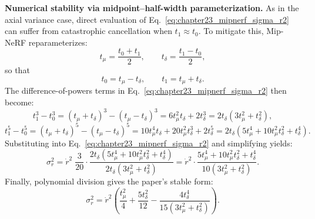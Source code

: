 \begin{enrichment}
\begin{enrichment}
    \noindent
    \textbf{Numerical stability via midpoint--half-width parameterization.}  
    As in the axial variance case, direct evaluation of Eq.~\ref{eq:chapter23_mipnerf_sigma_r2} can suffer from catastrophic cancellation when $t_1 \approx t_0$.  
    To mitigate this, Mip-NeRF reparameterizes:
    \[
    t_\mu = \frac{t_0 + t_1}{2}, 
    \qquad
    t_\delta = \frac{t_1 - t_0}{2},
    \]
    so that
    \[
    t_0 = t_\mu - t_\delta,
    \qquad
    t_1 = t_\mu + t_\delta.
    \]
    The difference-of-powers terms in Eq.~\ref{eq:chapter23_mipnerf_sigma_r2} then become:
    \[
    t_1^3 - t_0^3
    = (t_\mu + t_\delta)^3 - (t_\mu - t_\delta)^3
    = 6 t_\mu^2 t_\delta + 2 t_\delta^3
    = 2 t_\delta \left( 3 t_\mu^2 + t_\delta^2 \right),
    \]
    \[
    t_1^5 - t_0^5
    = (t_\mu + t_\delta)^5 - (t_\mu - t_\delta)^5
    = 10 t_\mu^4 t_\delta + 20 t_\mu^2 t_\delta^3 + 2 t_\delta^5
    = 2 t_\delta \left( 5 t_\mu^4 + 10 t_\mu^2 t_\delta^2 + t_\delta^4 \right).
    \]
    Substituting into Eq.~\ref{eq:chapter23_mipnerf_sigma_r2} and simplifying yields:
    \[
    \sigma_r^2
    = \dot{r}^2 \; \frac{3}{20} \cdot
    \frac{2 t_\delta \left( 5 t_\mu^4 + 10 t_\mu^2 t_\delta^2 + t_\delta^4 \right)}
    {2 t_\delta \left( 3 t_\mu^2 + t_\delta^2 \right)}
    = \dot{r}^2 \cdot \frac{5 t_\mu^4 + 10 t_\mu^2 t_\delta^2 + t_\delta^4}{10 \left( 3 t_\mu^2 + t_\delta^2 \right)}.
    \]
    Finally, polynomial division gives the paper’s stable form:
    \begin{equation}
        \sigma_r^2
        = \dot{r}^2 \left( \frac{t_\mu^2}{4} + \frac{5 t_\delta^2}{12} - \frac{4 t_\delta^4}{15 \left( 3 t_\mu^2 + t_\delta^2 \right)} \right).
        \label{eq:chapter23_mipnerf_sigma_r2_stable}
    \end{equation}
    

\end{enrichment}
\end{enrichment}
